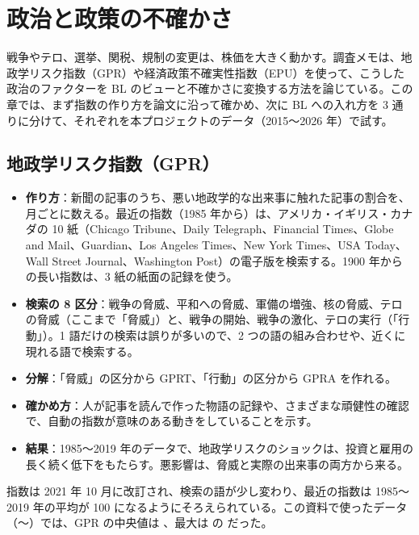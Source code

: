 \chapter{政治と政策の不確かさ}\label{ch:politics}

戦争やテロ、選挙、関税、規制の変更は、株価を大きく動かす。調査メモは、地政学リスク指数（GPR）や経済政策不確実性指数（EPU）を使って、こうした政治のファクターを BL のビューと不確かさに変換する方法を論じている。この章では、まず指数の作り方を論文に沿って確かめ、次に BL への入れ方を 3 通りに分けて、それぞれを本プロジェクトのデータ（2015〜2026 年）で試す。

\section{地政学リスク指数（GPR）}

\begin{paperbox}
\begin{itemize}
\item \textbf{作り方}：新聞の記事のうち、悪い地政学的な出来事に触れた記事の割合を、月ごとに数える。最近の指数（1985 年から）は、アメリカ・イギリス・カナダの 10 紙（Chicago Tribune、Daily Telegraph、Financial Times、Globe and Mail、Guardian、Los Angeles Times、New York Times、USA Today、Wall Street Journal、Washington Post）の電子版を検索する。1900 年からの長い指数は、3 紙の紙面の記録を使う。
\item \textbf{検索の 8 区分}：戦争の脅威、平和への脅威、軍備の増強、核の脅威、テロの脅威（ここまで「脅威」）と、戦争の開始、戦争の激化、テロの実行（「行動」）。1 語だけの検索は誤りが多いので、2 つの語の組み合わせや、近くに現れる語で検索する。
\item \textbf{分解}：「脅威」の区分から GPRT、「行動」の区分から GPRA を作れる。
\item \textbf{確かめ方}：人が記事を読んで作った物語の記録や、さまざまな頑健性の確認で、自動の指数が意味のある動きをしていることを示す。
\item \textbf{結果}：1985〜2019 年のデータで、地政学リスクのショックは、投資と雇用の長く続く低下をもたらす。悪影響は、脅威と実際の出来事の両方から来る。
\end{itemize}
\end{paperbox}

指数は 2021 年 10 月に改訂され、検索の語が少し変わり、最近の指数は 1985〜2019 年の平均が 100 になるようにそろえられている。この資料で使ったデータ（〜）では、GPR の中央値は 、最大は  の  だった。

